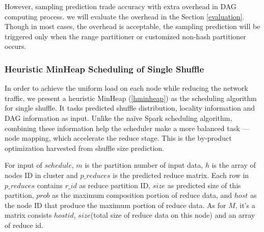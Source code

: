 However, sampling prediction trade accuracy with extra overhead in DAG computing process. we will evaluate the overhead in the Section \ref{evaluation}. Though in most cases, the overhead is acceptable, the sampling prediction will be triggered only when the range partitioner or customized non-hash partitioner occurs.

\subsubsection{Heuristic MinHeap Scheduling of Single Shuffle}\label{h-minheap}
In order to achieve the uniform load on each node while reducing the network traffic, we present a heuristic MinHeap (\ref{hminheap}) as the scheduling algorithm for single shuffle. It tasks predicted shuffle distribution, locality information and DAG information as input. Unlike the na\"{i}ve Spark scheduling algorithm, combining these information help the scheduler make a more balanced task --- node mapping, which accelerate the reduce stage. This is the by-product optimization harvested from shuffle size prediction.

For input of $schedule$, $m$ is the partition number of input data, $h$ is the array of nodes ID in cluster and $p\_reduces$ is the predicted reduce matrix. Each row in $p\_reduces$ contains $r\_id$ as reduce partition ID, $size$ as predicted size of this partition, $prob$ as the maximum composition portion of reduce data, and $host$ as the node ID that produce the maximum portion of reduce data. As for $M$, it's a matrix consists $hostid$, $size$(total size of reduce data on this node) and an array of reduce id. 

